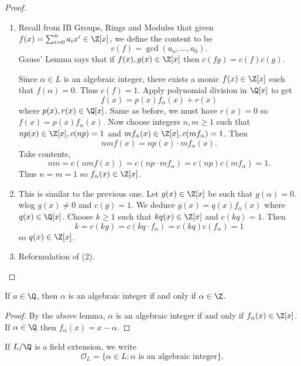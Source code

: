 \documentclass[a4paper]{article}
\renewcommand*{\O}{\mathcal{O}}
\begin{document}
\begin{proof}\leavevmode
  \begin{enumerate}
  \item Recall from IB Groups, Rings and Modules that given \(f(x) = \sum_{i = 0}^n a_ix^i \in \Z[x]\), we define the content to be
    \[
      c(f) = \gcd(a_n, \dots, a_0).
    \]
    Gauss' Lemma says that if \(f(x), g(x) \in \Z[x]\) then \(c(fg) = c(f)c(g)\).

    Since \(\alpha \in L\) is an algebraic integer, there exists a monic \(f(x) \in \Z[x]\) such that \(f(\alpha) = 0\). Thus \(c(f) = 1\). Apply polynomial division in \(\Q[x]\) to get
    \[
      f(x) = p(x)f_\alpha(x) + r(x)
    \]
    where \(p(x), r(x) \in \Q[x]\). Same as before, we must have \(r(x) = 0\) so \(f(x) = p(x)f_\alpha(x)\). Now choose integers \(n, m \geq 1\) such that \(np(x) \in \Z[x], c(np) = 1\) and \(mf_\alpha(x) \in \Z[x], c(mf_\alpha) = 1\). Then
    \[
      nmf(x) = np(x) \cdot mf_\alpha(x).
    \]
    Take contents,
    \[
      nm = c(nmf(x)) = c(np \cdot mf_\alpha) = c(np)c(mf_\alpha) = 1.
    \]
    Thus \(n = m = 1\) so \(f_\alpha(x) \in \Z[x]\).
  \item This is similar to the previous one. Let \(g(x) \in \Z[x]\) be such that \(g(\alpha) = 0\). wlog \(g(x) \neq 0\) and \(c(g) = 1\). We deduce \(g(x) = q(x)f_\alpha(x)\) where \(q(x) \in \Q[x]\). Choose \(k \geq 1\) such that \(kq(x) \in \Z[x]\) and \(c(kq) = 1\). Then
    \[
      k = c(kg) = c(kq \cdot f_\alpha) = c(kq) c(f_\alpha) = 1
    \]
    so \(q(x) \in \Z[x]\).
  \item Reformulation of (2).
  \end{enumerate}
\end{proof}

\begin{corollary}
  If \(a \in \Q\), then \(\alpha\) is an algebraic integer if and only if \(\alpha \in \Z\).
\end{corollary}

\begin{proof}
  By the above lemma, \(\alpha\) is an algebraic integer if and only if \(f_\alpha(x) \in \Z[x]\). If \(\alpha \in \Q\) then \(f_\alpha(x) = x - \alpha\).
\end{proof}

\begin{notation}
  If \(L/\Q\) is a field extension, we write
  \[
    \O_L = \{\alpha \in L: \alpha \text{ is an algebraic integer}\}.
  \]
\end{notation}
\end{document}
